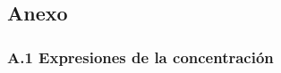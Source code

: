 
\label{sec:anexo}
\subsection*{\textcolor{blueunam}{Anexo}}

\label{sec:anexo:tom}
\subsubsection*{\textcolor{blueunam}{A.1 Expresiones de la concentración}}
